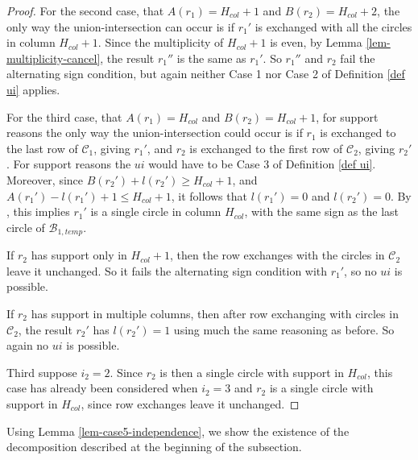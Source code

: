 \documentclass[11pt,letterpaper]{amsart}
\newcommand{\BB}{\mathcal{B}}
\newcommand{\CC}{\mathcal{C}}
\numberwithin{equation}{section}
\begin{document}
\begin{proof}
    For the second case, that $A(r_1) = H_{col}+1$ and $B(r_2) = H_{col}+2$, the only way the union-intersection can occur is if $r_1'$ is exchanged with all the circles in column $H_{col}+1$. Since the multiplicity of $H_{col}+1$ is even, by Lemma \ref{lem-multiplicity-cancel}, the result $r_1''$ is the same as $r_1'$. So $r_1''$ and $r_2$ fail the alternating sign condition, but again neither Case 1 nor Case 2 of Definition \ref{def ui} applies.

    For the third case, that $A(r_1) = H_{col}$ and $B(r_2) = H_{col}+1$, for support reasons the only way the union-intersection could occur is if $r_1$ is exchanged to the last row of $\CC_1$, giving $r_1'$, and $r_2$ is exchanged to the first row of $\CC_2$, giving $r_2'$. For support reasons the $ui$ would have to be Case 3 of Definition \ref{def ui}. Moreover, since $B(r_2') + l(r_2') \geq H_{col}+1$, and $A(r_1') - l(r_1') + 1 \leq H_{col}+1$, it follows that $l(r_1') = 0$ and $l(r_2') = 0$. By \cite[Lemma 7.9]{HKT26}, this implies $r_1'$ is a single circle in column $H_{col}$, with the same sign as the last circle of $\BB_{1, temp}$. 

    If $r_2$ has support only in $H_{col}+1$, then the row exchanges with the circles in $\CC_2$ leave it unchanged. So it fails the alternating sign condition with $r_1'$, so no $ui$ is possible.

    If $r_2$ has support in multiple columns, then after row exchanging with circles in $\CC_2$, the result $r_2'$ has $l(r_2') = 1$ using much the same reasoning as before. So again no $ui$ is possible.

    Third suppose $i_2 = 2$. Since $r_2$ is then a single circle with support in $H_{col}$, this case has already been considered when $i_2 = 3$ and $r_2$ is a single circle with support in $H_{col}$, since row exchanges leave it unchanged.
\end{proof}

Using Lemma \ref{lem-case5-independence}, we show the existence of the decomposition described at the beginning of the subsection.
\end{document}
